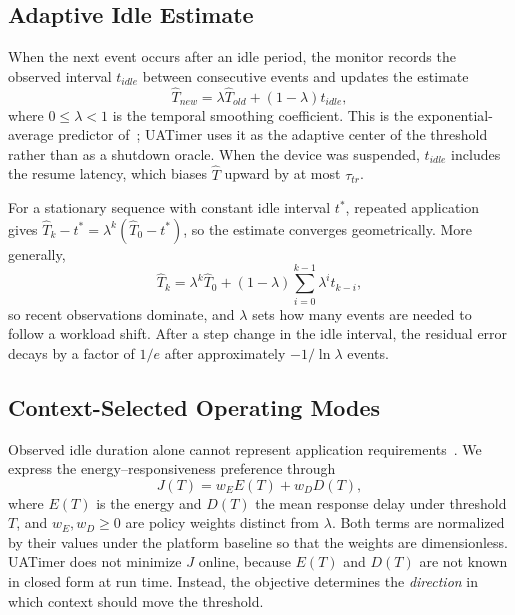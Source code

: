 \documentclass[journal]{IEEEtran}
\begin{document}
\subsection{Adaptive Idle Estimate}
When the next event occurs after an idle period, the monitor records the observed interval $t_{idle}$ between consecutive events and updates the estimate
\begin{equation}
\hat T_{new}=\lambda \hat T_{old}+(1-\lambda)t_{idle},
\label{eq:update}
\end{equation}
where $0\leq\lambda<1$ is the temporal smoothing coefficient. This is the exponential-average predictor of~\cite{hwang2000predictive}; UATimer uses it as the adaptive center of the threshold rather than as a shutdown oracle. When the device was suspended, $t_{idle}$ includes the resume latency, which biases $\hat T$ upward by at most $\tau_{tr}$.

For a stationary sequence with constant idle interval $t^*$, repeated application gives $\hat T_k-t^*=\lambda^k(\hat T_0-t^*)$, so the estimate converges geometrically. More generally,
\begin{equation}
\hat T_k=\lambda^k\hat T_0+(1-\lambda)\sum_{i=0}^{k-1}\lambda^i t_{k-i},
\label{eq:ewma}
\end{equation}
so recent observations dominate, and $\lambda$ sets how many events are needed to follow a workload shift. After a step change in the idle interval, the residual error decays by a factor of $1/e$ after approximately $-1/\ln\lambda$ events.

\subsection{Context-Selected Operating Modes}
Observed idle duration alone cannot represent application requirements~\cite{lee2017cas,sang2024qos}. We express the energy--responsiveness preference through
\begin{equation}
J(T)=w_E E(T)+w_D D(T),
\label{eq:cost}
\end{equation}
where $E(T)$ is the energy and $D(T)$ the mean response delay under threshold $T$, and $w_E,w_D\ge 0$ are policy weights distinct from $\lambda$. Both terms are normalized by their values under the platform baseline so that the weights are dimensionless. UATimer does not minimize $J$ online, because $E(T)$ and $D(T)$ are not known in closed form at run time. Instead, the objective determines the \emph{direction} in which context should move the threshold.
\end{document}
